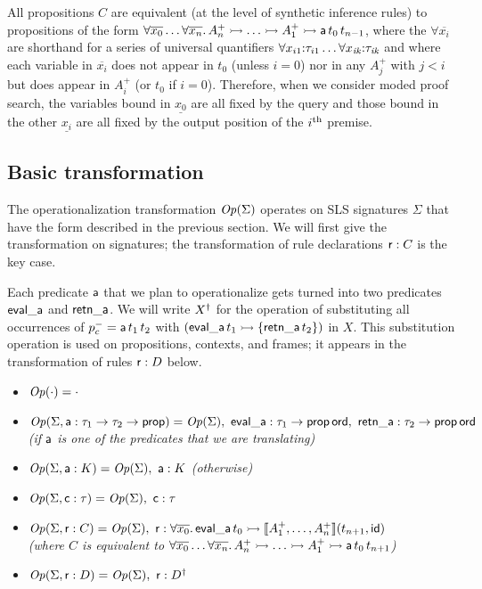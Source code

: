 All propositions $C$ are equivalent (at the level of synthetic
inference rules) to propositions of the form $\forall
\overline{x_0}\ldots \forall \overline{x_n}.\,A^+_n \rightarrowtail \ldots
\rightarrowtail A^+_1 \rightarrowtail {\sf a}\,t_{0}\,t_{n-1}$, where the $\forall
\overline{x_i}$ are shorthand for a series of universal quantifiers
$\forall {x_{i1}}{:}{\tau_{i1}} \ldots \forall {x_{\it
    ik}}{:}{\tau_{\it ik}}$ and where each variable in
$\overline{x_i}$ does not appear in $t_0$ (unless $i = 0$) nor in any
$A^+_j$ with $j < i$ but does appear in $A^+_i$ (or $t_0$ if $i =
0$). Therefore, when we consider moded proof search, the variables
bound in $\underline{x_0}$ are all fixed by the query and those bound
in the other $\underline{x_i}$ are all fixed by the output position of
the $i^{\rm th}$ premise.

\subsection{Basic transformation}
\label{sec:trans-basic}

The operationalization transformation ${\it Op}({\Sigma})$
operates on SLS signatures $\Sigma$ that have the form described in the
previous section. We
will first give the transformation on signatures; the transformation
of rule declarations ${\sf r} : C$ is the key case.

Each predicate ${\sf a}$ that we plan to operationalize
gets turned into two predicates ${\sf eval\_a}$ and ${\sf retn\_a}$.
We will write ${{X}^\dag}$ for the operation of substituting all
occurrences of $p^-_c = {\sf a}\,t_1\,t_2$ with $({\sf eval\_a}\,t_1
\rightarrowtail \{ {\sf retn\_a}\,t_2 \})$ in $X$. This substitution operation
is used on propositions, contexts, and frames; it appears in the 
transformation of rules ${\sf r} : D$ below.

\begin{itemize}
\item ${\it Op}({\cdot}) = \cdot$
\item ${\it Op}({\Sigma, {\sf a} : \tau_1 \rightarrow \tau_2
    \rightarrow {\sf prop}}) = {\it Op}({\Sigma}), ~ {\sf eval\_a} :
  \tau_1 \rightarrow {\sf prop\,ord}, ~ {\sf retn\_a} : \tau_2
  \rightarrow {\sf prop\,ord}$ \\ {\it (if $\sf a$ is one of the
    predicates that we are translating)}
\item ${\it Op}({\Sigma, {\sf a} : K}) = {\it Op}({\Sigma}), ~ {\sf a}
  : K$ {\it (otherwise)}
\item ${\it Op}({\Sigma, {\sf c} : \tau}) = {\it Op}({\Sigma}), ~ {\sf
    c} : \tau$ 
\item ${\it Op}({\Sigma, {\sf r} : C}) = {\it Op}({\Sigma}), ~ {\sf r}
  : \forall \overline{x_0}.\, {\sf eval\_a}\,t_0 \rightarrowtail \llbracket A^+_1,
  \ldots, A^+_n \rrbracket (t_{n+1}, {\sf id})$ \\ {\it (where $C$ is
    equivalent to $\forall \overline{x_0}\ldots \forall
    \overline{x_n}.\, A^+_n \rightarrowtail \ldots \rightarrowtail A^+_1 \rightarrowtail {\sf
      a}\,t_{0}\,t_{n+1}$)}
\item ${\it Op}({\Sigma, {\sf r} : D}) = {\it Op}({\Sigma}), ~ {\sf r}
  : {{D}^\dag}$
\end{itemize}

